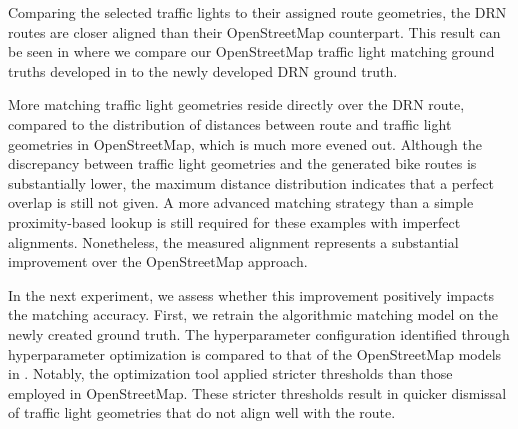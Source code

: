 Comparing the selected traffic lights to their assigned route geometries, the DRN routes are closer aligned than their OpenStreetMap counterpart. This result can be seen in  where we compare our OpenStreetMap traffic light matching ground truths developed in  to the newly developed DRN ground truth. 

More matching traffic light geometries reside directly over the DRN route, compared to the distribution of distances between route and traffic light geometries in OpenStreetMap, which is much more evened out. Although the discrepancy between traffic light geometries and the generated bike routes is substantially lower, the maximum distance distribution indicates that a perfect overlap is still not given. A more advanced matching strategy than a simple proximity-based lookup is still required for these examples with imperfect alignments. Nonetheless, the measured alignment represents a substantial improvement over the OpenStreetMap approach. 

\begin{table}[t]
\caption{Refitted thresholds of the algorithmic traffic light matching model on the new routing, compared to our two previous models. Differences in the thresholds may indicate that the models handle matching on the different datasets more strictly or less strictly. A detailed explanation of the threshold IDs is given in }
\label{tab:hyperparameter-tuning-results-drn}
\end{table}

In the next experiment, we assess whether this improvement positively impacts the matching accuracy. First, we retrain the algorithmic matching model on the newly created ground truth. The hyperparameter configuration identified through hyperparameter optimization is compared to that of the OpenStreetMap models in . Notably, the optimization tool applied stricter thresholds than those employed in OpenStreetMap. These stricter thresholds result in quicker dismissal of traffic light geometries that do not align well with the route.

